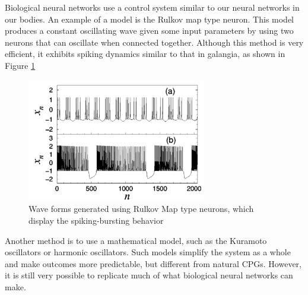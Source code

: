                Biological neural networks use a control system similar to our neural networks in our bodies. An example of a model is the Rulkov map type neuron. This model produces a constant oscillating wave given some input parameters by using two neurons that can oscillate when connected together. Although this method is very efficient, it exhibits spiking dynamics similar to that in galangia, \cite{SpikingNeuralBehavior} as shown in Figure \ref{fig:CPGSpiking} 
                \begin{figure}[H]
                    \centering
                    \includegraphics[width=0.7\textwidth]{figures/CPG_NeuralSpiking.png}
                    \caption{Wave forms generated using Rulkov Map type neurons, which display the spiking-bursting behavior \cite{SpikingNeuralBehavior}}
                    \label{fig:CPGSpiking}
                \end{figure}

                Another method is to use a mathematical model, such as the Kuramoto oscillators or harmonic oscillators. Such models simplify the system as a whole and make outcomes more predictable, but different from natural CPGs. However, it is still very possible to replicate much of what biological neural networks can make. 

